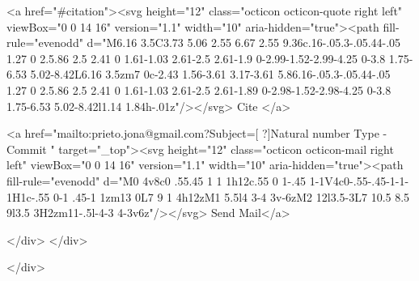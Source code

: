       <a  href="#citation"><svg height="12" class="octicon octicon-quote right left" viewBox="0 0 14 16" version="1.1" width="10" aria-hidden="true"><path fill-rule="evenodd" d="M6.16 3.5C3.73 5.06 2.55 6.67 2.55 9.36c.16-.05.3-.05.44-.05 1.27 0 2.5.86 2.5 2.41 0 1.61-1.03 2.61-2.5 2.61-1.9 0-2.99-1.52-2.99-4.25 0-3.8 1.75-6.53 5.02-8.42L6.16 3.5zm7 0c-2.43 1.56-3.61 3.17-3.61 5.86.16-.05.3-.05.44-.05 1.27 0 2.5.86 2.5 2.41 0 1.61-1.03 2.61-2.5 2.61-1.89 0-2.98-1.52-2.98-4.25 0-3.8 1.75-6.53 5.02-8.42l1.14 1.84h-.01z"/></svg> Cite
      </a>

      <a href="mailto:prieto.jona@gmail.com?Subject=[ ?]Natural number Type - Commit " target="_top"><svg height="12" class="octicon octicon-mail right left" viewBox="0 0 14 16" version="1.1" width="10" aria-hidden="true"><path fill-rule="evenodd" d="M0 4v8c0 .55.45 1 1 1h12c.55 0 1-.45 1-1V4c0-.55-.45-1-1-1H1c-.55 0-1 .45-1 1zm13 0L7 9 1 4h12zM1 5.5l4 3-4 3v-6zM2 12l3.5-3L7 10.5 8.5 9l3.5 3H2zm11-.5l-4-3 4-3v6z"/></svg> Send Mail</a>

    </div>
  </div>

</div>




